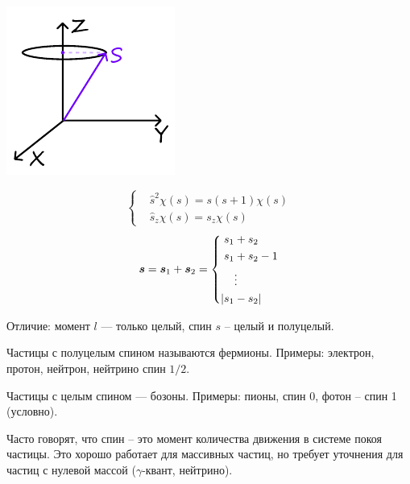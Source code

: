 \begin{minipage}{0.45\textwidth}
    \includegraphics[width=0.8\linewidth]{image/s.pdf}
\end{minipage}
\hfill
\begin{minipage}{0.45\textwidth}
    \begin{equation*}
    	\left\{
    	\begin{aligned}
    		&\hat{s}^2 \chi(s) = s(s+1) \chi(s)\\
    		&\hat{s}_z \chi(s) = s_z \chi(s)
    	\end{aligned}
    	\right.
    \end{equation*}
    \begin{equation*}
    	\mbox{\boldmath $s$} = \mbox{\boldmath $s$}_1 + \mbox{\boldmath $s$}_2 = \left\{
    	\begin{aligned}
    		s_1 &+ s_2\\
    		s_1 &+ s_2 -1\\
    		&\vdots\\
    		|s_1 &- s_2|
    	\end{aligned}
    	\right.
    \end{equation*}
\end{minipage}
Отличие: момент $l$ --- только целый, спин $s$ -- целый и полуцелый.

Частицы с полуцелым спином называются фермионы. Примеры: электрон, протон, нейтрон, нейтрино спин $1/2$.

Частицы с целым спином --- бозоны. Примеры: пионы, спин 0, фотон -- спин 1 (условно).

Часто говорят, что спин -- это момент количества движения в системе покоя частицы. Это хорошо работает для массивных частиц, но требует уточнения для частиц с нулевой массой ($\gamma$-квант, нейтрино).

